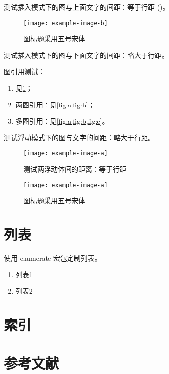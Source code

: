 测试插入模式下的图与上面文字的间距：等于行距 (\the\textfloatsep)。

\begin{figure}[h]
	\centering
	\texttt{[image: example-image-b]}
	\caption{图标题采用五号宋体}
	\label{fig:a}
\end{figure}

测试插入模式下的图与下面文字的间距：略大于行距。

图引用测试：

\begin{enumerate}
	\item	见\cref{fig:a}；
	\item 两图引用：见\cref{fig:a,fig:b}；
	\item 多图引用：见\cref{fig:a,fig:b,fig:c}。
\end{enumerate}

\clearpage

测试浮动模式下的图与文字的间距：略大于行距。

\begin{figure}[t]
	\centering
	\texttt{[image: example-image-a]}
	\caption{测试两浮动体间的距离：等于行距}
	\label{fig:b}
\end{figure}

\begin{figure}[t]
	\centering
	\texttt{[image: example-image-a]}
	\caption{图标题采用五号宋体}
	\label{fig:c}
\end{figure}

\section{列表}

使用 \textsf{enumerate} 宏包定制列表。

\begin{enumerate}
	\item 列表1
	\item 列表2
\end{enumerate}

\section{索引}


\section{参考文献}

